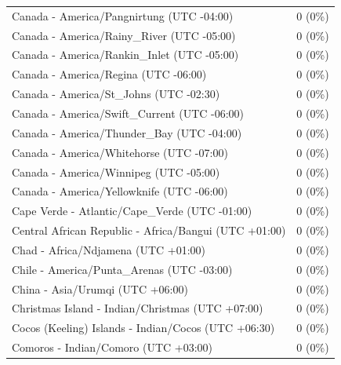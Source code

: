 \documentclass[
  english,
  man]{apa6}
\begin{document}
\begin{appendix}
\begin{table}
{\begin{tabular}[t]{ll}
\hspace{1em}Canada - America/Pangnirtung (UTC -04:00) & 0 (0\%)\\
\addlinespace
\hspace{1em}Canada - America/Rainy\_River (UTC -05:00) & 0 (0\%)\\
\hspace{1em}Canada - America/Rankin\_Inlet (UTC -05:00) & 0 (0\%)\\
\hspace{1em}Canada - America/Regina (UTC -06:00) & 0 (0\%)\\
\hspace{1em}Canada - America/St\_Johns (UTC -02:30) & 0 (0\%)\\
\hspace{1em}Canada - America/Swift\_Current (UTC -06:00) & 0 (0\%)\\
\addlinespace
\hspace{1em}Canada - America/Thunder\_Bay (UTC -04:00) & 0 (0\%)\\
\hspace{1em}Canada - America/Whitehorse (UTC -07:00) & 0 (0\%)\\
\hspace{1em}Canada - America/Winnipeg (UTC -05:00) & 0 (0\%)\\
\hspace{1em}Canada - America/Yellowknife (UTC -06:00) & 0 (0\%)\\
\hspace{1em}Cape Verde - Atlantic/Cape\_Verde (UTC -01:00) & 0 (0\%)\\
\addlinespace
\hspace{1em}Central African Republic - Africa/Bangui (UTC +01:00) & 0 (0\%)\\
\hspace{1em}Chad - Africa/Ndjamena (UTC +01:00) & 0 (0\%)\\
\hspace{1em}Chile - America/Punta\_Arenas (UTC -03:00) & 0 (0\%)\\
\hspace{1em}China - Asia/Urumqi (UTC +06:00) & 0 (0\%)\\
\hspace{1em}Christmas Island - Indian/Christmas (UTC +07:00) & 0 (0\%)\\
\addlinespace
\hspace{1em}Cocos (Keeling) Islands - Indian/Cocos (UTC +06:30) & 0 (0\%)\\
\hspace{1em}Comoros - Indian/Comoro (UTC +03:00) & 0 (0\%)\\

\end{tabular}}
\end{table}
\end{appendix}
\end{document}
